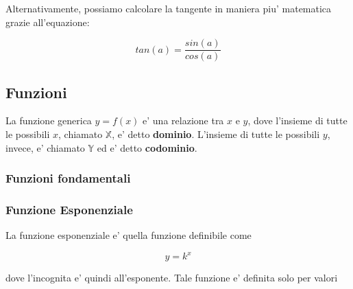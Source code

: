 \documentclass{article}
\begin{document}
{{    Alternativamente, possiamo calcolare la tangente in maniera piu' matematica grazie all'equazione:

    $$ tan(a) = \frac{sin(a)}{cos(a)} $$

    \pagebreak

    \subsection{Funzioni}
    La funzione generica $ y = f(x) $ e' una relazione tra $ x $ e $ y $, dove l'insieme di tutte le possibili $ x $, chiamato $ \mathbb{X} $, e' detto \textbf{dominio}. L'insieme di tutte le possibili $ y $, invece, e' chiamato $ \mathbb{Y} $ ed e' detto \textbf{codominio}.

    \subsubsection{Funzioni fondamentali}

    \pagebreak

    \subsubsection{Funzione Esponenziale}
    La funzione esponenziale e' quella funzione definibile come

    $$ y = k^x $$

    dove l'incognita e' quindi all'esponente. Tale funzione e' definita solo per valori 
    
}}
\end{document}
